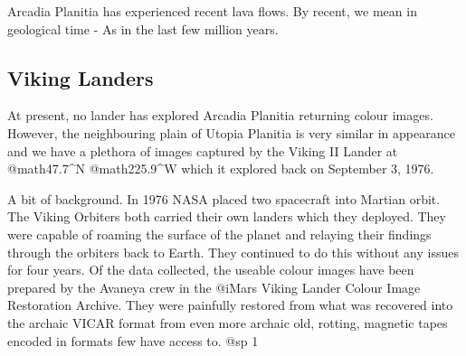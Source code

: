 Arcadia Planitia has experienced recent lava flows. By recent, we mean in geological time - As in the last few million years.

\subsection{Viking Landers}

At present, no lander has explored Arcadia Planitia returning colour images. However, the neighbouring plain of Utopia Planitia is very similar in appearance and we have a plethora of images captured by the Viking II Lander at @math{47.7^{\circ}}N @math{225.9^{\circ}}W which it explored back on September 3, 1976.

A bit of background. In 1976 NASA placed two spacecraft into Martian orbit. The Viking Orbiters both carried their own landers which they deployed. They were capable of roaming the surface of the planet and relaying their findings through the orbiters back to Earth. They continued to do this without any issues for four years. Of the data collected, the useable colour images have been prepared by the Avaneya crew in the @i{Mars Viking Lander Colour Image Restoration Archive}. They were painfully restored from what was recovered into the archaic VICAR format from even more archaic old, rotting, magnetic tapes encoded in formats few have access to.
@sp 1


